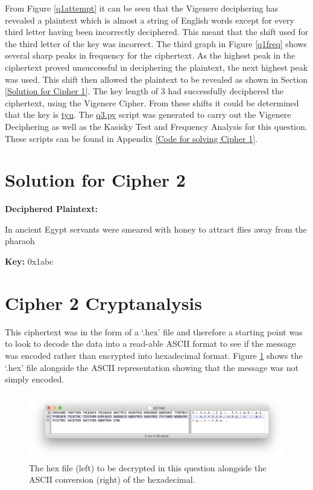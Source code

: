 \documentclass[a4paper,11pt]{article}
\begin{document}
	From Figure \ref{q1attempt} it can be seen that the Vigenere deciphering has revealed a plaintext which is almost a string of English words except for every third letter having been incorrectly deciphered. This meant that the shift used for the third letter of the key was incorrect. The third graph in Figure \ref{q1freq} shows several sharp peaks in frequency for the ciphertext. As the highest peak in the ciphertext proved unsuccessful in deciphering the plaintext, the next highest peak was used. This shift then allowed the plaintext to be revealed as shown in Section \ref{Solution for Cipher 1}. The key length of 3 had successfully deciphered the ciphertext, using the Vigenere Cipher. From these shifts it could be determined that the key is \url{tyu}. The \url{q3.py} script was generated to carry out the Vigenere Deciphering as well as the Kasisky Test and Frequency Analysis for this question. These scripts can be found in Appendix \ref{Code for solving Cipher 1}.
	
\section{Solution for Cipher 2} \label{Solution for Cipher 2}
	{\bfseries{Deciphered Plaintext:}} 
	
	In ancient Egypt servants were smeared with honey to attract flies away from the pharaoh
	
	{\bfseries{Key:}} 0x1abc

\section{Cipher 2 Cryptanalysis} \label{Cipher 2 Cryptanalysis}		
	
	This ciphertext was in the form of a `.hex' file and therefore a starting point was to look to decode the data into a read-able ASCII format to see if the message was encoded rather than encrypted into hexadecimal format. Figure \ref{hexToAscii} shows the `.hex' file alongside the ASCII representation showing that the message was not simply encoded. 
	
		\begin{figure}[h]
			\centering
			\includegraphics[width = 16cm]{img/hexToAscii}
			\captionsetup{width = 13cm}
			\caption{The hex file (left) to be decrypted in this question alongside the ASCII conversion (right) of the hexadecimal.}
			\label{hexToAscii}
		\end{figure}	
	
\end{document}
